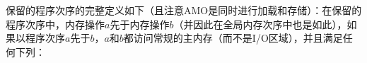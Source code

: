 
保留的程序次序的完整定义如下（且注意AMO是同时进行加载和存储）：在保留的程序次序中，内存操作$a$先于内存操作$b$（并因此在全局内存次序中也是如此），如果以程序次序$a$先于$b$，$a$和$b$都访问常规的主内存（而不是I/O区域），并且满足任何下列：

